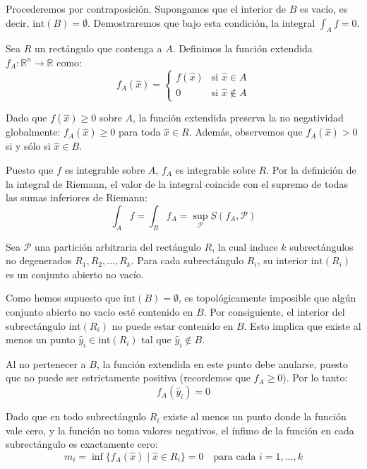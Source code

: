 \documentclass[11pt,letterpaper]{article}
\begin{document}
Procederemos por contraposición. Supongamos que el interior de $B$ es vacío, es decir, $\text{int}(B) = \emptyset$. Demostraremos que bajo esta condición, la integral $\int_A f = 0$.

Sea $R$ un rectángulo que contenga a $A$. Definimos la función extendida $f_A: \mathbb{R}^n \rightarrow \mathbb{R}$ como:
\begin{equation*}
f_A(\hat{x}) = 
\begin{cases} 
f(\hat{x}) & \text{si } \hat{x} \in A \\ 
0 & \text{si } \hat{x} \notin A 
\end{cases}
\end{equation*}

Dado que $f(\hat{x}) \ge 0$ sobre $A$, la función extendida preserva la no negatividad globalmente: $f_A(\hat{x}) \ge 0$ para toda $\hat{x} \in R$. Además, observemos que $f_A(\hat{x}) > 0$ si y sólo si $\hat{x} \in B$.

Puesto que $f$ es integrable sobre $A$, $f_A$ es integrable sobre $R$. Por la definición de la integral de Riemann, el valor de la integral coincide con el supremo de todas las sumas inferiores de Riemann:
\begin{equation*}
\int_A f = \int_R f_A = \sup_{\mathcal{P}} \underline{S}(f_A, \mathcal{P})
\end{equation*}

Sea $\mathcal{P}$ una partición arbitraria del rectángulo $R$, la cual induce $k$ subrectángulos no degenerados $R_1, R_2, \dots, R_k$. Para cada subrectángulo $R_i$, su interior $\text{int}(R_i)$ es un conjunto abierto no vacío.

Como hemos supuesto que $\text{int}(B) = \emptyset$, es topológicamente imposible que algún conjunto abierto no vacío esté contenido en $B$. Por consiguiente, el interior del subrectángulo $\text{int}(R_i)$ no puede estar contenido en $B$. Esto implica que existe al menos un punto $\hat{y}_i \in \text{int}(R_i)$ tal que $\hat{y}_i \notin B$.

Al no pertenecer a $B$, la función extendida en este punto debe anularse, puesto que no puede ser estrictamente positiva (recordemos que $f_A \ge 0$). Por lo tanto:
\begin{equation*}
f_A(\hat{y}_i) = 0
\end{equation*}

Dado que en todo subrectángulo $R_i$ existe al menos un punto donde la función vale cero, y la función no toma valores negativos, el ínfimo de la función en cada subrectángulo es exactamente cero:
\begin{equation*}
m_i = \inf \{f_A(\hat{x}) \mid \hat{x} \in R_i\} = 0 \quad \text{para cada } i = 1, \dots, k
\end{equation*}
\end{document}
